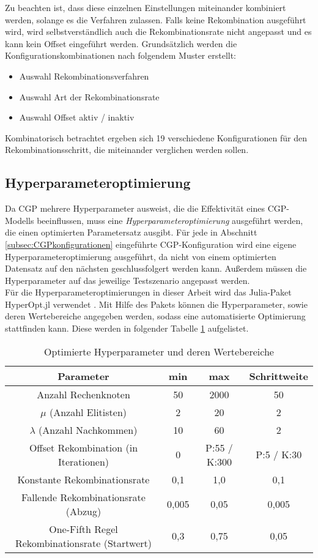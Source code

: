 Zu beachten ist, dass diese einzelnen Einstellungen miteinander kombiniert werden, solange es die Verfahren zulassen.
Falls keine Rekombination ausgeführt wird, wird selbstverständlich auch die Rekombinationsrate nicht angepasst und es kann kein Offset eingeführt werden.
Grundsätzlich werden die Konfigurationskombinationen nach folgendem Muster erstellt:
\begin{itemize}
	\item Auswahl Rekombinationsverfahren
	\item Auswahl Art der Rekombinationsrate
	\item Auswahl Offset aktiv / inaktiv
\end{itemize}

Kombinatorisch betrachtet ergeben sich 19 verschiedene Konfigurationen für den Rekombinationsschritt, die miteinander verglichen werden sollen. 


\subsection{Hyperparameteroptimierung}
\label{subsec:hpo}

Da CGP mehrere Hyperparameter ausweist, die die Effektivität eines CGP-Modells beeinflussen, muss eine \emph{Hyperparameteroptimierung} ausgeführt werden, die einen optimierten Parametersatz ausgibt.
Für jede in Abschnitt \ref{subsec:CGPkonfigurationen} eingeführte CGP-Konfiguration wird eine eigene Hyperparameteroptimierung ausgeführt, da nicht von einem optimierten Datensatz auf den nächsten geschlussfolgert werden kann.
Außerdem müssen die Hyperparameter auf das jeweilige Testszenario angepasst werden.\\
Für die Hyperparameteroptimierungen in dieser Arbeit wird das Julia-Paket HyperOpt.jl verwendet \cite{carlson_baggepinnenhyperoptjl_2025}.
Mit Hilfe des Pakets können die Hyperparameter, sowie deren Wertebereiche angegeben werden, sodass eine automatisierte Optimierung stattfinden kann.
Diese werden in folgender Tabelle \ref{table:hyperopt} aufgelistet.

\begin{table}[H]
	\centering
	\begin{tabular}{c | c | c | c}
		\textbf{Parameter} & \textbf{min} & \textbf{max} & \textbf{Schrittweite}\\
		\hline
		Anzahl Rechenknoten & 50 & 2000 & 50 \\
		\hline
		$\mu$ (Anzahl Elitisten) & 2 & 20 & 2\\
		\hline
		$\lambda$ (Anzahl Nachkommen) & 10 & 60 & 2 \\
		\hline
		Offset Rekombination (in Iterationen)& 0 & P:55 / K:300 & P:5 / K:30\\
		\hline
		Konstante Rekombinationsrate & 0,1 & 1,0 & 0,1\\
		\hline
		Fallende Rekombinationsrate (Abzug) & 0,005 & 0,05 & 0,005\\
		\hline
		One-Fifth Regel Rekombinationsrate (Startwert) & 0,3 & 0,75 & 0,05\\
	\end{tabular}
	\caption{Optimierte Hyperparameter und deren Wertebereiche}
	\label{table:hyperopt}
\end{table}

